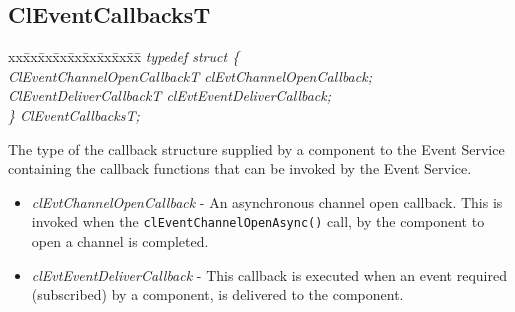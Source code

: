 \begin{flushleft}
\subsection{ClEventCallbacksT}
\begin{tabbing}
xx\=xx\=xx\=xx\=xx\=xx\=xx\=xx\=xx\=\kill
\textit{typedef struct \{}\\
\>\>\>\>\textit{ClEventChannelOpenCallbackT clEvtChannelOpenCallback;}\\
\>\>\>\>\textit{ClEventDeliverCallbackT clEvtEventDeliverCallback;}\\
\textit{\} ClEventCallbacksT;}\end{tabbing}
The type of the callback structure supplied by a component to the Event Service containing the callback functions that can be invoked by the Event Service. 
\begin{itemize}
 \item
 \textit{clEvtChannelOpenCallback} - An asynchronous channel open callback. This is invoked when the {\tt{clEventChannelOpenAsync()}} call, by the 
 component to  open a channel is completed.  
\item
\textit{clEvtEventDeliverCallback} - This callback is executed when an event required (subscribed) by a component, is delivered to
the component. 
\end{itemize}




\end{flushleft}
